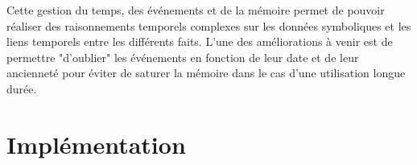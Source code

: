 \documentclass[a4paper,11pt,twoside]{StyleThese}
\begin{document}
Cette gestion du temps, des événements et de la mémoire permet de pouvoir réaliser des raisonnements temporels complexes sur les données symboliques et les liens temporels entre les différents faits. L'une des améliorations à venir est de permettre "d'oublier" les événements en fonction de leur date et de leur ancienneté pour éviter de saturer la mémoire dans le cas d'une utilisation longue durée.






\section{Implémentation}
\label{sec:impl}
\end{document}
